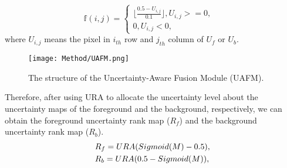 \documentclass[lettersize,journal]{IEEEtran}
\begin{document}
\begin{equation}
\label{equ10}
\mathbb{f}(i,j) = \left\{
\begin{array}{lr} \lfloor \frac {0.5 - U_{{i,j}}}{0.1}  \rfloor, U_{{i,j}} >= 0, & \\
0, U_{{i,j}} < 0, &
\end{array}
\right.
\end{equation}
where $U_{{i,j}}$ means the pixel in $i_{th}$ row and $j_{th}$ column of $U_{f}$ or $U_{b}$.

\begin{figure}[]
\centering
\texttt{[image: Method/UAFM.png]}
\caption{The structure of the Uncertainty-Aware Fusion Module (UAFM).}
\vspace{-1.0em}
\label{fig_5}
\end{figure}

Therefore, after using URA to allocate the uncertainty level about the uncertainty maps of the foreground and the background, respectively, we can obtain the foreground uncertainty rank map ($R_{f}$) and the background uncertainty rank map ($R_{b}$).
\begin{equation}
\centering
\label{equ7-1} 
\begin{split}
    &R_{f} = URA(Sigmoid(M)-0.5), \\
    &R_{b} = URA(0.5 - Sigmoid(M)),
\end{split}
\end{equation}
\end{document}
